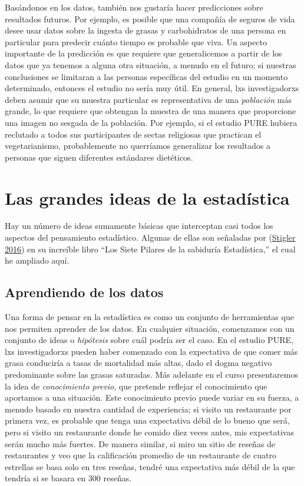 \documentclass[
  12pt,
]{book}
\theoremstyle{definition}
\theoremstyle{definition}
\theoremstyle{definition}
\theoremstyle{remark}
\begin{document}
Basándonos en los datos, también nos gustaría hacer predicciones sobre resultados futuros. Por ejemplo, es posible que una compañía de seguros de vida desee usar datos sobre la ingesta de grasas y carbohidratos de una persona en particular para predecir cuánto tiempo es probable que viva. Un aspecto importante de la predicción es que requiere que generalicemos a partir de los datos que ya tenemos a alguna otra situación, a menudo en el futuro; si nuestras conclusiones se limitaran a las personas específicas del estudio en un momento determinado, entonces el estudio no sería muy útil. En general, lxs investigadorxs deben asumir que su muestra particular es representativa de una \emph{población} más grande, lo que requiere que obtengan la muestra de una manera que proporcione una imagen no sesgada de la población. Por ejemplo, si el estudio PURE hubiera reclutado a todos sus participantes de sectas religiosas que practican el vegetarianismo, probablemente no querríamos generalizar los resultados a personas que siguen diferentes estándares dietéticos.

\hypertarget{las-grandes-ideas-de-la-estaduxedstica}{%
\section{Las grandes ideas de la estadística}\label{las-grandes-ideas-de-la-estaduxedstica}}

Hay un número de ideas sumamente básicas que interceptan casi todos los aspectos del pensamiento estadístico. Algunas de ellas son señaladas por (\protect\hyperlink{ref-stig}{Stigler 2016}) en su increíble libro ``Los Siete Pilares de la sabiduría Estadística,'' el cual he ampliado aquí.

\hypertarget{aprendiendo-de-los-datos}{%
\subsection{Aprendiendo de los datos}\label{aprendiendo-de-los-datos}}

Una forma de pensar en la estadística es como un conjunto de herramientas que nos permiten aprender de los datos. En cualquier situación, comenzamos con un conjunto de ideas o \emph{hipótesis} sobre cuál podría ser el caso. En el estudio PURE, lxs investigadorxs pueden haber comenzado con la expectativa de que comer más grasa conduciría a tasas de mortalidad más altas, dado el dogma negativo predominante sobre las grasas saturadas. Más adelante en el curso presentaremos la idea de \emph{conocimiento previo}, que pretende reflejar el conocimiento que aportamos a una situación. Este conocimiento previo puede variar en su fuerza, a menudo basado en nuestra cantidad de experiencia; si visito un restaurante por primera vez, es probable que tenga una expectativa débil de lo bueno que será, pero si visito un restaurante donde he comido diez veces antes, mis expectativas serán mucho más fuertes. De manera similar, si miro un sitio de reseñas de restaurantes y veo que la calificación promedio de un restaurante de cuatro estrellas se basa solo en tres reseñas, tendré una expectativa más débil de la que tendría si se basara en 300 reseñas.
\end{document}
